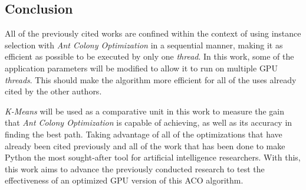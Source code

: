 \subsection{Conclusion}

All of the previously cited works are confined within the context of using instance selection with \emph{Ant Colony Optimization} in a sequential manner, making it as efficient as possible to be executed by only one \emph{thread}. In this work, some of the application parameters will be modified to allow it to run on multiple GPU \emph{threads}. This should make the algorithm more efficient for all of the uses already cited by the other authors.

\emph{K-Means} will be used as a comparative unit in this work to measure the gain that \emph{Ant Colony Optimization} is capable of achieving, as well as its accuracy in finding the best path. Taking advantage of all of the optimizations that have already been cited previously and all of the work that has been done to make Python the most sought-after tool for artificial intelligence researchers. With this, this work aims to advance the previously conducted research to test the effectiveness of an optimized GPU version of this ACO algorithm.
